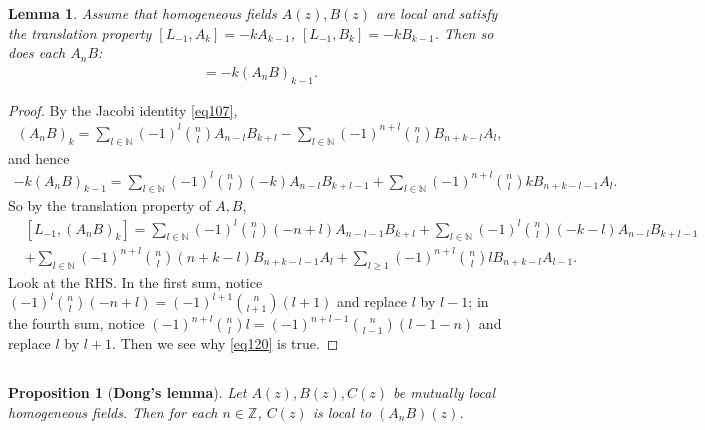 \documentclass[11pt,b5paper,notitlepage]{article}
\theoremstyle{definition}
\theoremstyle{plain}
\newtheorem{pp}[df]{Proposition}
\newtheorem{lm}[df]{Lemma}
\newcommand{\Nbb}{\mathbb N}
\newcommand{\Zbb}{\mathbb Z}
\numberwithin{equation}{section}
\begin{document}
\begin{lm}\label{lb79}
Assume that homogeneous fields $A(z),B(z)$ are local and satisfy the translation property $[L_{-1},A_k]=-kA_{k-1}$, $[L_{-1},B_k]=-kB_{k-1}$. Then so does each $A_nB$:
\begin{align}
[L_{-1},(A_nB)_k]=-k(A_nB)_{k-1}.\label{eq120}	
\end{align}
\end{lm}


\begin{proof}
By the Jacobi identity \eqref{eq107},
\begin{align}
(A_nB)_k=\sum_{l\in\Nbb}(-1)^l{n\choose l}A_{n-l}B_{k+l}-\sum_{l\in\Nbb}(-1)^{n+l}{n\choose l}B_{n+k-l}A_l, \label{eq126}	
\end{align}
and hence
\begin{align*}
-k(A_nB)_{k-1}=\sum_{l\in\Nbb}(-1)^l{n\choose l}(-k)A_{n-l}B_{k+l-1}+\sum_{l\in\Nbb}(-1)^{n+l}{n\choose l}kB_{n+k-l-1}A_l.	
\end{align*}
So by the translation property of $A,B$,
\begin{align*}
&[L_{-1},(A_nB)_k]=\sum_{l\in\Nbb}(-1)^l{n\choose l}(-n+l)A_{n-l-1}B_{k+l}+\sum_{l\in\Nbb}(-1)^l{n\choose l}(-k-l)A_{n-l}B_{k+l-1}\\
&+\sum_{l\in\Nbb}(-1)^{n+l}{n\choose l}(n+k-l)B_{n+k-l-1}A_l+\sum_{l\geq1}(-1)^{n+l}{n\choose l}lB_{n+k-l}A_{l-1}.
\end{align*}
Look at the RHS. In the first sum, notice  $(-1)^l{n\choose l}(-n+l)=(-1)^{l+1}{n\choose l+1}(l+1)$ and replace $l$ by $l-1$; in the fourth sum, notice $(-1)^{n+l}{n\choose l}l=(-1)^{n+l-1}{n\choose l-1}(l-1-n)$ and replace $l$ by $l+1$. Then we see why \eqref{eq120} is true.
\end{proof}



\subsection{}\label{lb86}

\begin{pp}[\textbf{Dong's lemma}]
Let $A(z),B(z),C(z)$ be mutually local homogeneous fields. Then for each $n\in\Zbb$, $C(z)$ is local to $(A_nB)(z)$. 
\end{pp}
\end{document}
